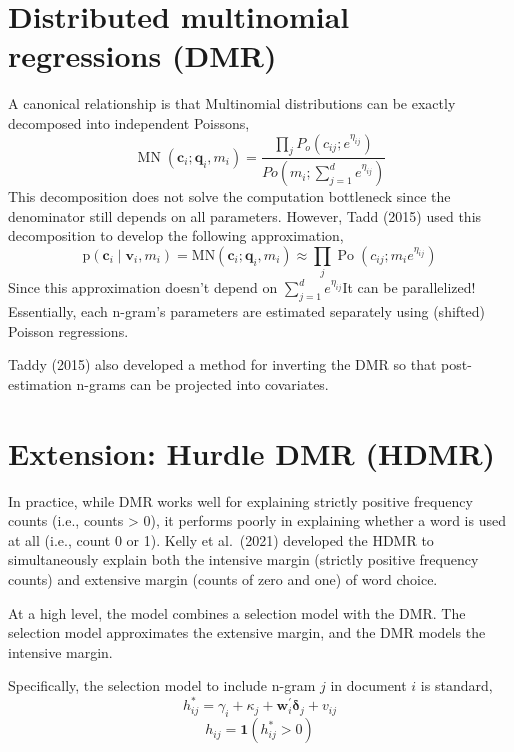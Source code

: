 \documentclass[
]{book}
\begin{document}
\hypertarget{distributed-multinomial-regressions-dmr}{%
\section{Distributed multinomial regressions (DMR)}\label{distributed-multinomial-regressions-dmr}}

A canonical relationship is that Multinomial distributions can be exactly decomposed into independent Poissons,
\[
\operatorname{MN}\left(\mathbf{c}_{i} ; \mathbf{q}_{i}, m_{i}\right)=\frac{\prod_{j} P_{o}\left(c_{i j} ; e^{\eta_{i j}}\right)}{P o\left(m_{i} ; \sum_{j=1}^{d} e^{\eta_{i j}}\right)}
\]
This decomposition does not solve the computation bottleneck since the denominator still depends on all parameters. However, Tadd (2015) used this decomposition to develop the following approximation,
\[
\mathrm{p}\left(\mathbf{c}_{i} \mid \mathbf{v}_{i}, m_{i}\right)=\mathrm{MN}\left(\mathbf{c}_{i} ; \mathbf{q}_{i}, m_{i}\right) \approx \prod_{j} \operatorname{Po}\left(c_{i j} ; m_{i} e^{\eta_{i j}}\right)
\]
Since this approximation doesn't depend on \(\sum_{j=1}^{d} e^{\eta_{i j}}\)It can be parallelized! Essentially, each n-gram's parameters are estimated separately using (shifted) Poisson regressions.

Taddy (2015) also developed a method for inverting the DMR so that post-estimation n-grams can be projected into covariates.

\hypertarget{extension-hurdle-dmr-hdmr}{%
\section{Extension: Hurdle DMR (HDMR)}\label{extension-hurdle-dmr-hdmr}}

In practice, while DMR works well for explaining strictly positive frequency counts (i.e., counts \textgreater{} 0), it performs poorly in explaining whether a word is used at all (i.e., count 0 or 1). Kelly et al.~(2021) developed the HDMR to simultaneously explain both the intensive margin (strictly positive frequency counts) and extensive margin (counts of zero and one) of word choice.

At a high level, the model combines a selection model with the DMR. The selection model approximates the extensive margin, and the DMR models the intensive margin.

Specifically, the selection model to include n-gram \(j\) in document \(i\) is standard,
\[
h_{i j}^{*}=\gamma_{i}+\kappa_{j}+\boldsymbol{w}_{i}^{\prime} \boldsymbol{\delta}_{j}+v_{i j}
\]
\[
h_{i j}=\mathbf{1}\left(h_{i j}^{*}>0\right)
\]
\end{document}
